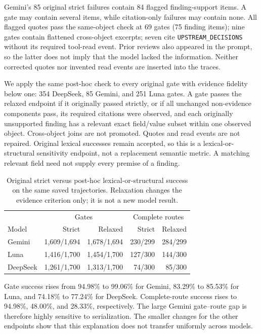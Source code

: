 Gemini's 85 original strict failures contain 84 flagged finding-support items. A gate may contain
several items, while citation-only failures may contain none. All flagged quotes pass the
same-object check at 69 gates (75 finding items); nine gates contain flattened cross-object
excerpts; seven cite \texttt{UPSTREAM\_DECISIONS} without its required tool-read event. Prior
reviews also appeared in the prompt, so the latter does not imply that the model lacked the
information. Neither corrected quotes nor invented read events are inserted into the traces.

We apply the same post-hoc check to every original gate with evidence fidelity below one:
354 DeepSeek, 85 Gemini, and 251 Luna gates. A gate passes the relaxed endpoint if it originally
passed strictly, or if all unchanged non-evidence components pass, its required citations were
observed, and each originally unsupported finding has a relevant exact field/value subset
within one observed object. Cross-object joins are not promoted. Quotes and read events are
not repaired. Original lexical successes remain accepted, so this is a lexical-or-structural
sensitivity endpoint, not a replacement semantic metric. A matching relevant field need not
supply every premise of a finding.

\begin{table}[!htb]
\centering\small
\caption{Original strict versus post-hoc lexical-or-structural success on the same saved
trajectories. Relaxation changes the evidence criterion only; it is not a new model result.}
\begin{tabular}{@{}lrrrr@{}}
\toprule
& \multicolumn{2}{c}{Gates} & \multicolumn{2}{c}{Complete routes}\\
Model & Strict & Relaxed & Strict & Relaxed\\
\midrule
Gemini & 1,609/1,694 & 1,678/1,694 & 230/299 & 284/299\\
Luna & 1,416/1,700 & 1,454/1,700 & 127/300 & 144/300\\
DeepSeek & 1,261/1,700 & 1,313/1,700 & 74/300 & 85/300\\
\bottomrule
\end{tabular}
\end{table}

Gate success rises from 94.98\% to 99.06\% for Gemini, 83.29\% to 85.53\% for Luna, and
74.18\% to 77.24\% for DeepSeek. Complete-route success rises to 94.98\%, 48.00\%, and
28.33\%, respectively. The large Gemini gate--route gap is therefore highly sensitive to
serialization. The smaller changes for the other endpoints show that this explanation does
not transfer uniformly across models.

